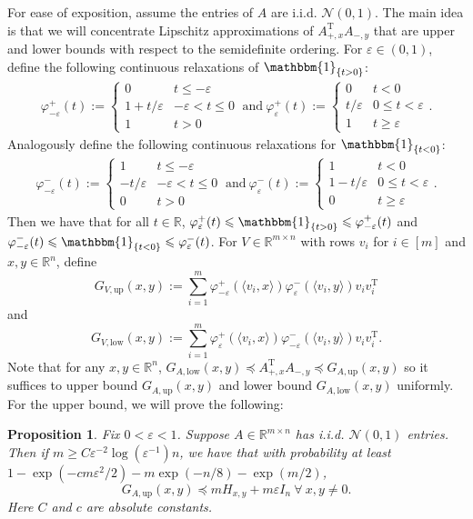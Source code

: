 \documentclass[11pt]{article}
\newcommand{\R}{\mathbb{R}}
\newcommand{\N}{\mathcal{N}}
\newcommand{\one}{\operatorname{\mathbbm{1}}}
\newcommand{\T}{\mathrm{T}}
\renewcommand{\epsilon}{\varepsilon}
\newtheorem{proposition}{Proposition}
\begin{document}
For ease of exposition, assume the entries of $A$ are i.i.d. $\N(0,1)$. The main idea is that we will concentrate Lipschitz approximations of $A_{+,x}^{\T}A_{-,y}$ that are upper and lower bounds with respect to the semidefinite ordering. For $\epsilon \in (0,1)$, define the following continuous relaxations of $\one_{\{t > 0\}}$: \begin{align*}
    \varphi^{+}_{-\epsilon}(t) := \begin{cases}
    0 & t \leqslant - \epsilon \\
    1 + t/\epsilon & - \epsilon < t \leqslant 0 \\
    1 & t > 0
    \end{cases}\ \text{and}\ \varphi^{+}_{\epsilon}(t) := \begin{cases}
    0 & t < 0 \\
     t/\epsilon & 0 \leqslant t < \epsilon \\
    1 & t \geqslant \epsilon
    \end{cases}.
\end{align*} Analogously define the following continuous relaxations for $\one_{\{t < 0\}}$: \begin{align*}
    \varphi^{-}_{-\epsilon}(t) := \begin{cases}
    1 & t \leqslant - \epsilon \\
    - t/\epsilon & - \epsilon < t \leqslant 0 \\
    0 & t > 0
    \end{cases}\ \text{and}\ \varphi^{-}_{\epsilon}(t) := \begin{cases}
    1 & t < 0 \\
    1- t/\epsilon & 0 \leqslant t < \epsilon \\
    0 & t \geqslant \epsilon
    \end{cases}.
\end{align*} Then we have that for all $t \in \R$, $
    \varphi^{+}_{\epsilon}(t) \leqslant \one_{\{t > 0\}} \leqslant \varphi^{+}_{-\epsilon}(t)$ and $\varphi^{-}_{-\epsilon}(t) \leqslant \one_{\{t < 0\}} \leqslant \varphi^{-}_{\epsilon}(t)$.
For $V \in \R^{m \times n}$ with rows $v_i$ for $i \in [m]$ and $x,y\in\R^n$, define
    $$G_{V,\text{up}}(x,y)  := \sum_{i=1}^m \varphi_{-\epsilon}^{+}(\langle v_i,x\rangle)\varphi_{\epsilon}^{-}(\langle v_i,y\rangle)v_iv_i^{\T}$$ and $$G_{V,\text{low}}(x,y) := \sum_{i=1}^m \varphi_{\epsilon}^{+}(\langle v_i,x\rangle)\varphi_{-\epsilon}^{-}(\langle v_i,y\rangle)v_iv_i^{\T}.$$
 Note that for any $x,y \in \R^n$, $G_{A,\text{low}}(x,y) \preceq  A_{+,x}^{\T}A_{-,y} \preceq G_{A,\text{up}}(x,y)$ so it suffices to upper bound $G_{A,\text{up}}(x,y)$ and lower bound $G_{A,\text{low}}(x,y)$ uniformly. For the upper bound, we will prove the following:
\begin{proposition}
Fix $0 < \epsilon < 1$. Suppose $A \in \R^{m \times n}$ has i.i.d. $\N(0,1)$ entries. Then if $m \geqslant C\epsilon^{-2}\log(\epsilon^{-1}) n$, we have that with probability at least $1-\exp(-cm\epsilon^2/2) - m\exp(-n/8)-\exp(m/2)$, $$G_{A,\text{up}}(x,y) \preceq mH_{x,y} + m\epsilon  I_n\ \forall\ x,y \neq 0.$$ Here $C$ and $c$ are absolute constants.
\end{proposition} 
\end{document}
